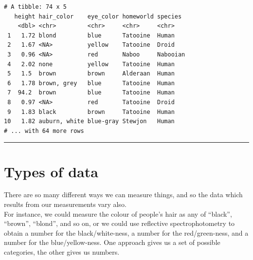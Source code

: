 \documentclass[]{book}
\begin{document}
\begin{verbatim}
# A tibble: 74 x 5
   height hair_color    eye_color homeworld species 
    <dbl> <chr>         <chr>     <chr>     <chr>   
 1   1.72 blond         blue      Tatooine  Human   
 2   1.67 <NA>          yellow    Tatooine  Droid   
 3   0.96 <NA>          red       Naboo     Nabooian
 4   2.02 none          yellow    Tatooine  Human   
 5   1.5  brown         brown     Alderaan  Human   
 6   1.78 brown, grey   blue      Tatooine  Human   
 7  94.2  brown         blue      Tatooine  Human   
 8   0.97 <NA>          red       Tatooine  Droid   
 9   1.83 black         brown     Tatooine  Human   
10   1.82 auburn, white blue-gray Stewjon   Human   
# ... with 64 more rows
\end{verbatim}

\begin{center}\rule{0.5\linewidth}{0.5pt}\end{center}

\hypertarget{types-of-data}{%
\section{Types of data}\label{types-of-data}}

There are so many different ways we can measure things, and so the data which results from our measurements vary also.\\
For instance, we could measure the colour of people's hair as any of ``black'', ``brown'', ``blond'', and so on, or we could use reflective spectrophotometry to obtain a number for the black/white-ness, a number for the red/green-ness, and a number for the blue/yellow-ness. One approach gives us a set of possible categories, the other gives us numbers.
\end{document}
